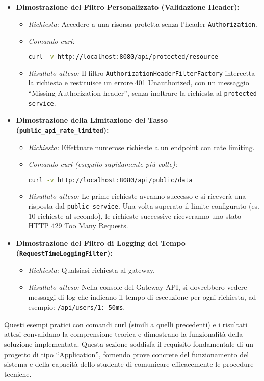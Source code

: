 \begin{itemize}
    \item \textbf{Dimostrazione del Filtro Personalizzato (Validazione Header):}
    \begin{itemize}
        \item \textit{Richiesta:} Accedere a una risorsa protetta senza l'header \texttt{Authorization}.
        \item \textit{Comando curl:}
        \begin{lstlisting}[language=bash]
curl -v http://localhost:8080/api/protected/resource
        \end{lstlisting}
        \item \textit{Risultato atteso:} Il filtro \texttt{AuthorizationHeaderFilterFactory} intercetta la richiesta e restituisce un errore 401 Unauthorized, con un messaggio \enquote{Missing Authorization header}, senza inoltrare la richiesta al \texttt{protected-service}.
    \end{itemize}

    \item \textbf{Dimostrazione della Limitazione del Tasso (\texttt{public\_api\_rate\_limited}):}
    \begin{itemize}
        \item \textit{Richiesta:} Effettuare numerose richieste a un endpoint con rate limiting.
        \item \textit{Comando curl (eseguito rapidamente più volte):}
        \begin{lstlisting}[language=bash]
curl -v http://localhost:8080/api/public/data
        \end{lstlisting}
        \item \textit{Risultato atteso:} Le prime richieste avranno successo e si riceverà una risposta dal \texttt{public-service}. Una volta superato il limite configurato (es. 10 richieste al secondo), le richieste successive riceveranno uno stato HTTP 429 Too Many Requests.
    \end{itemize}

    \item \textbf{Dimostrazione del Filtro di Logging del Tempo (\texttt{RequestTimeLoggingFilter}):}
    \begin{itemize}
        \item \textit{Richiesta:} Qualsiasi richiesta al gateway.
        \item \textit{Risultato atteso:} Nella console del Gateway API, si dovrebbero vedere messaggi di log che indicano il tempo di esecuzione per ogni richiesta, ad esempio: \texttt{/api/users/1: 50ms}.
    \end{itemize}
\end{itemize}
Questi esempi pratici con comandi curl (simili a quelli precedenti) e i risultati attesi convalidano la comprensione teorica e dimostrano la funzionalità della soluzione implementata. Questa sezione soddisfa il requisito fondamentale di un progetto di tipo \enquote{Application}, fornendo prove concrete del funzionamento del sistema e della capacità dello studente di comunicare efficacemente le procedure tecniche.